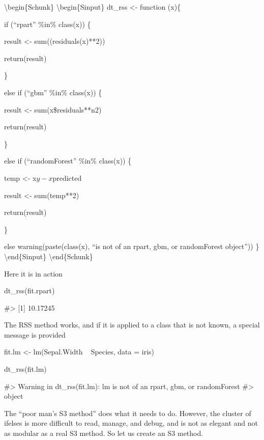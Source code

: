 \textbackslash{}begin\{Schunk\} \textbackslash{}begin\{Sinput\} dt\_rss
\textless{}- function (x)\{

if (``rpart'' \%in\% class(x)) \{

result \textless{}- sum((residuals(x)**2))

return(result)

\}

else if (``gbm'' \%in\% class(x)) \{

result \textless{}- sum(x\$residuals**n2)

return(result)

\}

else if (``randomForest'' \%in\% class(x)) \{

temp \textless{}- x\(y - x\)predicted

result \textless{}- sum(temp**2)

return(result)

\}

else warning(paste(class(x), ``is not of an rpart, gbm, or randomForest
object'')) \} \textbackslash{}end\{Sinput\}
\textbackslash{}end\{Schunk\}

Here it is in action

\begin{Schunk}
\begin{Sinput}
dt_rss(fit.rpart)
\end{Sinput}
\begin{Soutput}
#> [1] 10.17245
\end{Soutput}
\end{Schunk}

The RSS method works, and if it is applied to a class that is not known,
a special message is provided

\begin{Schunk}
\begin{Sinput}
fit.lm <- lm(Sepal.Width ~ Species, data = iris)

dt_rss(fit.lm)
\end{Sinput}
\begin{Soutput}
#> Warning in dt_rss(fit.lm): lm is not of an rpart, gbm, or randomForest
#> object
\end{Soutput}
\end{Schunk}

The ``poor man's S3 method'' does what it needs to do. However, the
cluster of ifelses is more difficult to read, manage, and debug, and is
not as elegant and not as modular as a real S3 method. So let us create
an S3 method.

